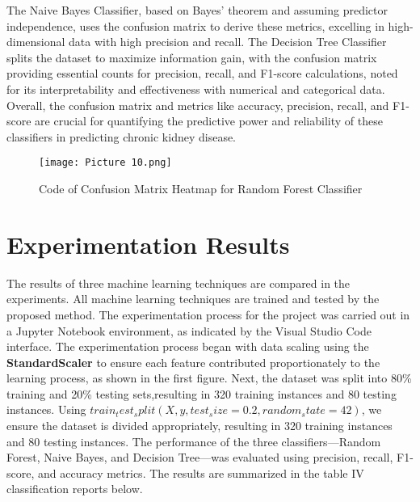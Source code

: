 \documentclass[conference]{IEEEtran}
\begin{document}
The Naive Bayes Classifier, based on Bayes' theorem and assuming predictor independence, uses the confusion matrix to derive these metrics, excelling in high-dimensional data with high precision and recall. The Decision Tree Classifier splits the dataset to maximize information gain, with the confusion matrix providing essential counts for precision, recall, and F1-score calculations, noted for its interpretability and effectiveness with numerical and categorical data. Overall, the confusion matrix and metrics like accuracy, precision, recall, and F1-score are crucial for quantifying the predictive power and reliability of these classifiers in predicting chronic kidney disease.

\begin{figure}
\centering
\texttt{[image: Picture 10.png]}
\caption{Code of Confusion Matrix Heatmap for Random Forest Classifier } \label{fig10}
\end{figure}


\section{Experimentation Results}

The results of three machine learning techniques are compared in the experiments. All machine learning techniques are trained and tested by the proposed method. The experimentation process for the project was carried out in a Jupyter Notebook environment, as indicated by the Visual Studio Code interface.
The experimentation process began with data scaling using the \textbf{StandardScaler} to ensure each feature contributed proportionately to the learning process, as shown in the first figure. Next, the dataset was split into 80\% training and 20\% testing sets,resulting in 320 training instances and 80 testing instances. Using \(train_test_split(X, y, test_size=0.2, random_state=42)\), we ensure the dataset is divided appropriately, resulting in 320 training instances and 80 testing instances.
The performance of the three classifiers—Random Forest, Naive Bayes, and Decision Tree—was evaluated using precision, recall, F1-score, and accuracy metrics. The results are summarized in the table IV classification reports below.
\end{document}
